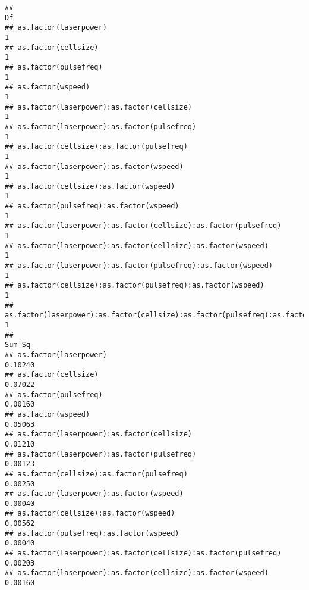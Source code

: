 \documentclass[
]{article}
\begin{document}
\begin{verbatim}
##                                                                                  Df
## as.factor(laserpower)                                                             1
## as.factor(cellsize)                                                               1
## as.factor(pulsefreq)                                                              1
## as.factor(wspeed)                                                                 1
## as.factor(laserpower):as.factor(cellsize)                                         1
## as.factor(laserpower):as.factor(pulsefreq)                                        1
## as.factor(cellsize):as.factor(pulsefreq)                                          1
## as.factor(laserpower):as.factor(wspeed)                                           1
## as.factor(cellsize):as.factor(wspeed)                                             1
## as.factor(pulsefreq):as.factor(wspeed)                                            1
## as.factor(laserpower):as.factor(cellsize):as.factor(pulsefreq)                    1
## as.factor(laserpower):as.factor(cellsize):as.factor(wspeed)                       1
## as.factor(laserpower):as.factor(pulsefreq):as.factor(wspeed)                      1
## as.factor(cellsize):as.factor(pulsefreq):as.factor(wspeed)                        1
## as.factor(laserpower):as.factor(cellsize):as.factor(pulsefreq):as.factor(wspeed)  1
##                                                                                   Sum Sq
## as.factor(laserpower)                                                            0.10240
## as.factor(cellsize)                                                              0.07022
## as.factor(pulsefreq)                                                             0.00160
## as.factor(wspeed)                                                                0.05063
## as.factor(laserpower):as.factor(cellsize)                                        0.01210
## as.factor(laserpower):as.factor(pulsefreq)                                       0.00123
## as.factor(cellsize):as.factor(pulsefreq)                                         0.00250
## as.factor(laserpower):as.factor(wspeed)                                          0.00040
## as.factor(cellsize):as.factor(wspeed)                                            0.00562
## as.factor(pulsefreq):as.factor(wspeed)                                           0.00040
## as.factor(laserpower):as.factor(cellsize):as.factor(pulsefreq)                   0.00203
## as.factor(laserpower):as.factor(cellsize):as.factor(wspeed)                      0.00160

\end{verbatim}
\end{document}
